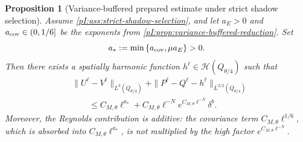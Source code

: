 \documentclass[11pt]{article}
\numberwithin{equation}{section}
\theoremstyle{plain}
\newtheorem{proposition}{Proposition}[section]
\theoremstyle{definition}
\theoremstyle{remark}
\newcommand{\calH}{\mathcal H}
\begin{document}
\begin{proposition}[Variance-buffered prepared estimate under strict shadow selection]
\label{pI:prop:localized-stress-shadow}
Assume \cref{pI:ass:strict-shadow-selection}, and let \(a_E>0\) and \(a_{\rm cov}\in(0,1/6]\) be the exponents from \cref{pI:prop:variance-buffered-reduction}.  Set
\[
        a_*:=\min\left\{a_{\rm cov},\mu a_E\right\}>0.
\]
Then there exists a spatially harmonic function \(h^\ell\in\calH(Q_{\theta/4})\) such that
\begin{equation}\label{pI:eq:localized-stress-shadow-assumption}
\begin{aligned}
&\|U^\ell-V^\ell\|_{L^3(Q_{\theta/4})}
+\|P^\ell-Q^\ell-h^\ell\|_{L^{3/2}(Q_{\theta/4})}\\
&\qquad\le
C_{M,\theta}\ell^{a_*}
+C_{M,\theta}\ell^{-N}e^{C_{M,\theta}\ell^{-N}}\delta^b .
\end{aligned}
\end{equation}
Moreover, the Reynolds contribution is additive: the covariance term \(C_{M,\theta}\ell^{1/6}\), which is absorbed into \(C_{M,\theta}\ell^{a_*}\), is not multiplied by the high factor \(e^{C_{M,\theta}\ell^{-N}}\).
\end{proposition}
\end{document}
